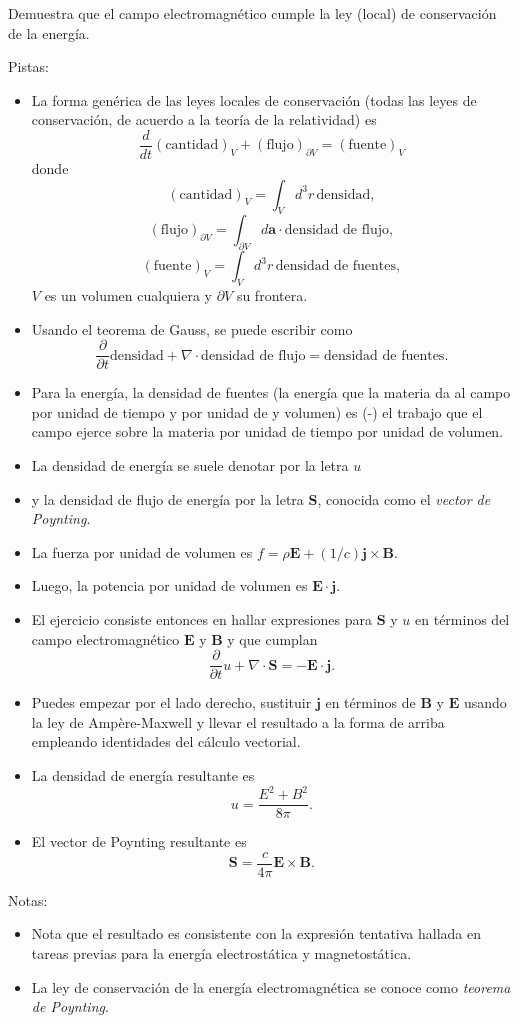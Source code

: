 \documentclass{exam}
\begin{document}
\begin{questions}
\question\label{15} Demuestra que el campo electromagnético cumple la
  ley (local) de conservación de la energía.

  Pistas:
  \begin{itemize}
  \item La forma genérica de las leyes locales de conservación (todas
    las leyes de conservación, de acuerdo a la teoría de la
    relatividad) es
    $$
    \frac{d}{d t}(\text{cantidad})_V+(\text{flujo})_{\partial V}=(\text{fuente})_V
    $$
    donde
    $$
    (\text{cantidad})_V=\int_V d^3r\, \text{densidad},
    $$
    $$
    (\text{flujo})_{\partial V}=\int_{\partial V} d\bm
    a\cdot\text{densidad de flujo},
    $$
    $$
    (\text{fuente})_V=\int_V d^3r\, \text{densidad de fuentes},
    $$
    $V$ es un volumen cualquiera y $\partial V$ su frontera.
  \item Usando el teorema de Gauss, se puede escribir como
    $$\frac{\partial}{\partial
      t}\text{densidad}+\nabla\cdot\text{densidad de
      flujo}=\text{densidad de fuentes}.
    $$
  \item Para la energía, la densidad de fuentes (la energía
    que la materia da al campo por unidad de tiempo y por unidad de
y    volumen) es (-) el trabajo que el campo ejerce sobre la materia
    por unidad de tiempo por unidad de volumen.
  \item La densidad de energía se suele denotar por la letra $u$
  \item y la densidad de flujo de energía por la letra $\bm S$,
    conocida como el {\em vector de Poynting}.
  \item La fuerza por unidad de volumen es $f=\rho\bm E+(1/c)\bm
    j\times\bm B$.
  \item Luego, la potencia por unidad de volumen es $\bm E\cdot\bm j$.
  \item El ejercicio consiste entonces en hallar expresiones para $\bm S$ y $u$
    en términos del campo electromagnético $\bm E$ y $\bm B$ y que
    cumplan
    $$
    \frac{\partial}{\partial t}u+\nabla\cdot\bm S=-\bm E\cdot\bm j.
    $$
  \item Puedes empezar por el lado derecho, sustituir $\bm j$ en
    términos de $\bm B$ y $\bm E$ usando la ley de Ampère-Maxwell y
    llevar el resultado a la forma de arriba empleando identidades del
    cálculo vectorial.
  \item La densidad de energía resultante es
    $$
    u=\frac{E^2+B^2}{8\pi}.
    $$
  \item El vector de Poynting resultante es
    $$
    \bm S=\frac{c}{4\pi}\bm E\times \bm B.
    $$
  \end{itemize}
  Notas:
  \begin{itemize}
  \item Nota que el resultado es consistente con la expresión
    tentativa hallada en tareas previas para la energía electrostática
    y magnetostática.
  \item La ley de conservación de la energía electromagnética se
    conoce como {\em teorema de Poynting}.
  \end{itemize}



\end{questions}
\end{document}

